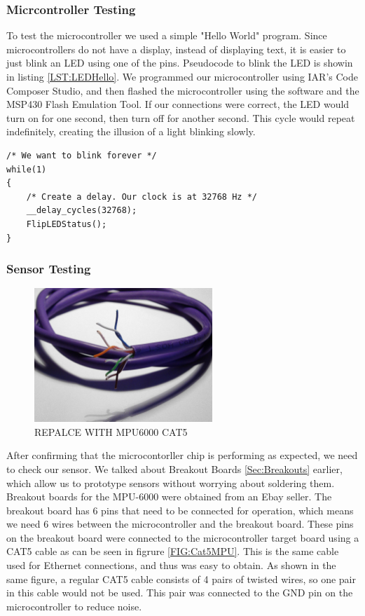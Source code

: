 \subsubsection{Micrcontroller Testing}
To test the microcontroller we used a simple "Hello World" program.
Since microcontrollers do not have a display, instead of displaying text,
it is easier to just blink an LED using one of the pins.
Pseudocode to blink the LED is showin in listing \ref{LST:LEDHello}.
We programmed our microcontroller using IAR's Code Composer Studio,
and then flashed the microcontroller using the software and the MSP430 Flash Emulation Tool.
If our connections were correct,
the LED would turn on for one second,
then turn off for another second.
This cycle would repeat indefinitely, creating the illusion of a light blinking slowly.
\begin{lstlisting}[caption=My caption,label=LST:LEDHello]
/* We want to blink forever */
while(1)
{
	/* Create a delay. Our clock is at 32768 Hz */
	__delay_cycles(32768);
	FlipLEDStatus();  
}
\end{lstlisting}


\subsubsection{Sensor Testing}
\label{Sec:SensorTesting}
\begin{figure}
\begin{center}
\includegraphics[width=0.6\textwidth]{images/Cat5Twist.jpg}
\caption{REPALCE WITH MPU6000 CAT5}
\label{Fig:CAt5MPU}
\end{center}
\end{figure}

After confirming that the microcontorller chip is performing as expected,
we need to check our sensor. We talked about Breakout Boards \ref{Sec:Breakouts} earlier,
which allow us to prototype sensors without worrying about soldering them.
Breakout boards for the MPU-6000 were obtained from an Ebay seller.
The breakout board has 6 pins that need to be connected for operation,
which means we need 6 wires between the microcontroller and the breakout board.
These pins on the breakout board were connected to the microcontroller target board using a CAT5 cable as can be seen in figrure \ref{FIG:Cat5MPU}.
This is the same cable used for Ethernet connections, and thus was easy to obtain.
As shown in the same figure,
a regular CAT5 cable consists of 4 pairs of twisted wires,
so one pair in this cable would not be used.
This pair was connected to the GND pin on the microcontroller to reduce noise.


